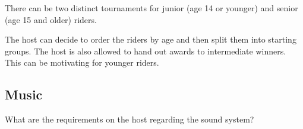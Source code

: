 There can be two distinct tournaments for junior (age 14 or younger) and senior (age 15 and older) riders.

The host can decide to order the riders by age and then split them into starting groups.
The host is also allowed to hand out awards to intermediate winners.
This can be motivating for younger riders.

\begin{comment2016}
\section{Music}

What are the requirements on the host regarding the sound system?
\end{comment2016}
